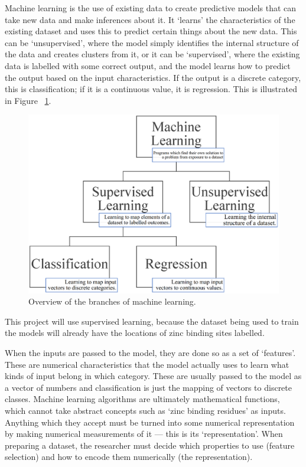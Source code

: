 Machine learning is the use of existing data to create predictive models that can take new data and make inferences about it. It `learns' the characteristics of the existing dataset and uses this to predict certain things about the new data. This can be `unsupervised', where the model simply identifies the internal structure of the data and creates clusters from it, or it can be `supervised', where the existing data is labelled with some correct output, and the model learns how to predict the output based on the input characteristics. If the output is a discrete category, this is classification; if it is a continuous value, it is regression. This is illustrated in Figure ~\ref{fig:machine-learning}.

\begin{figure}
\centering
\includegraphics[width=1.0\textwidth]{Figures/machine-learning.eps}
\caption{\label{fig:machine-learning} Overview of the branches of machine learning.}
\end{figure}

This project will use supervised learning, because the dataset being used to train the models will already have the locations of zinc binding sites labelled. 

When the inputs are passed to the model, they are done so as a set of `features'. These are numerical characteristics that the model actually uses to learn what kinds of input belong in which category. These are usually passed to the model as a vector of numbers and classification is just the mapping of vectors to discrete classes. Machine learning algorithms are ultimately mathematical functions, which cannot take abstract concepts such as `zinc binding residues' as inputs. Anything which they accept must be turned into some numerical representation by making numerical measurements of it --- this is its `representation'. When preparing a dataset, the researcher must decide which properties to use (feature selection) and how to encode them numerically (the representation).

